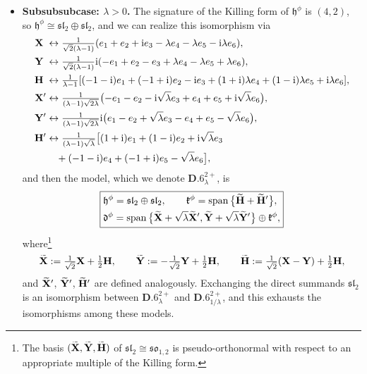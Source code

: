 \documentclass[10pt,a4paper]{amsart}
\newlength{\caseIndent}
\newcommand{\wt} [1]{\smash{\widetilde{#1}}}
\newcommand{\mbH}{\mathbf{H}}
\newcommand{\mbX}{\mathbf{X}}
\newcommand{\mbY}{\mathbf{Y}}
\newcommand{\mfd} {\mathfrak{d}}
\newcommand{\mfh} {\mathfrak{h}}
\newcommand{\mfk} {\mathfrak{k}}
\newcommand{\mfsl} {\mathfrak{sl}}
\newcommand{\mfso} {\mathfrak{so}}
\numberwithin{equation}{section}
\begin{document}
\begin{itemize}[leftmargin=\caseIndent]
\begin{itemize}[leftmargin=\caseIndent]
\begin{itemize}[leftmargin=\caseIndent]
		\item[] \textbf{Subsubsubcase: $\lambda > 0$.} The signature of the Killing form of $\mfh^{\phi}$ is $(4, 2)$, so $\mfh^{\phi} \cong \mfsl_2 \oplus \mfsl_2$, and we can realize this isomorphism via
			\begin{align*}
				\mbX\phantom{'}
					&\leftrightarrow \tfrac{1}{\sqrt{2} (\lambda - 1)} (e_1 + e_2 + {\rm i} e_3 - \lambda e_4 - \lambda e_5 - {\rm i} \lambda e_6) , \\
				\mbY\phantom{'}
					&\leftrightarrow \tfrac{1}{\sqrt{2} (\lambda - 1)} {\rm i} (-e_1 + e_2 - e_3 + \lambda e_4 - \lambda e_5 + \lambda e_6), \\
				\mbH\phantom{'}
					&\leftrightarrow \tfrac{1}{\lambda - 1} [(-1 - {\rm i}) e_ 1 + (-1 + {\rm i}) e_2 - {\rm i} e_3 + (1 + {\rm i}) \lambda e_4 + (1 - {\rm i}) \lambda e_5 + {\rm i} \lambda e_6], \\
 \mbX'
					&\leftrightarrow \tfrac{1}{(\lambda - 1) \sqrt{2 \lambda}} \big({-}e_1 - e_2 - {\rm i} \sqrt{\lambda} e_3 + e_4 + e_5 + {\rm i} \sqrt{\lambda} e_6\big), \\
				\mbY'
					&\leftrightarrow \tfrac{1}{(\lambda - 1) \sqrt{2 \lambda}} {\rm i} \big(e_1 - e_2 + \sqrt{\lambda} e_3 - e_4 + e_5 - \sqrt{\lambda} e_6\big), \\
				\mbH'
					&\leftrightarrow \tfrac{1}{(\lambda - 1) \sqrt{\lambda}} \big[(1 + {\rm i}) e_1 + (1 - {\rm i}) e_2 + {\rm i} \sqrt{\lambda} e_3 \\
 &\quad{} + (-1 - {\rm i}) e_4 + (-1 + {\rm i}) e_5 - \sqrt{\lambda} e_6\big] ,
			\end{align*}
		and then the model, which we denote $\mathbf{D.6}_{\lambda}^{2+}$, is
			\begin{equation*}
				\boxed{
 \begin{split}
& \mfh^{\phi} = \mfsl_2 \oplus \mfsl_2 , \qquad
	 	 \mfk^{\phi} = \operatorname{span}\big\{\wt\mbH + \wt\mbH'\big\} , \\
& \mfd^{\phi} = \operatorname{span}\big\{\wt\mbX + \sqrt{\lambda} \wt\mbX', \wt\mbY + \sqrt{\lambda} \wt\mbY'\big\} \oplus \mfk^{\phi} ,
 \end{split}
				}
			\end{equation*}
		where\footnote{The basis $(\wt\mbX, \wt\mbY, \wt\mbH)$ of $\mfsl_2 \cong \mfso_{1, 2}$ is pseudo-orthonormal with respect to an appropriate multiple of the Killing form.}
		\begin{gather*}
			\wt\mbX := \tfrac{1}{\sqrt{2}} \mbX + \tfrac{1}{2} \mbH , \qquad
			\wt\mbY := -\tfrac{1}{\sqrt{2}} \mbY + \tfrac{1}{2} \mbH , \qquad
			\wt\mbH := \tfrac{1}{\sqrt{2}} (\mbX - \mbY) + \tfrac{1}{2} \mbH ,
		\end{gather*}
		and $\wt\mbX'$, $\wt\mbY'$, $\wt\mbH'$ are defined analogously. Exchanging the direct summands $\mfsl_2$ is an isomorphism between $\mathbf{D.6}_{\lambda}^{2+}$ and $\mathbf{D.6}_{1 / \lambda}^{2+}$, and this exhausts the isomorphisms among these models.


\end{itemize}
\end{itemize}
\end{itemize}
\end{document}
